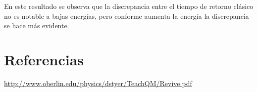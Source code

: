\documentclass[letterpaper,11pt]{article}
\begin{document}
En este resultado se observa que la discrepancia entre el tiempo de retorno clásico no es notable a bajas energías, pero conforme aumenta la energía la discrepancia se hace más evidente.

\section{Referencias}
\renewcommand*{\refname}{}
\begin{thebibliography}{100}

 \url{http://www.oberlin.edu/physics/dstyer/TeachQM/Revive.pdf}
 
\end{thebibliography}
\end{document}
